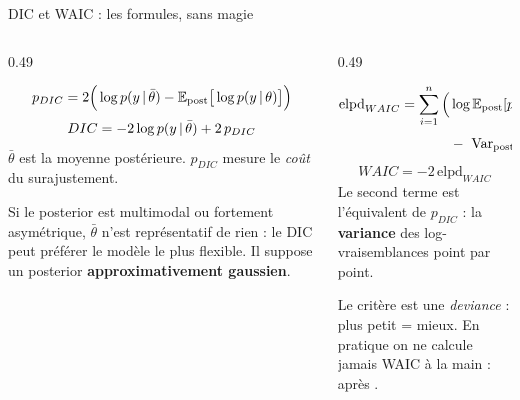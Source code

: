 \begin{frame}{DIC et WAIC : les formules, sans magie}
\small
\begin{columns}[t]
\begin{column}{0.49\textwidth}
\begin{ebox}
\[
p_{DIC} = 2\Big(\log p(y \,\vert\, \bar\theta) - \mathbb{E}_{\text{post}}\big[\log p(y \,\vert\, \theta)\big]\Big)
\]
\[
DIC = -2\log p(y \,\vert\, \bar\theta) + 2\,p_{DIC}
\]
$\bar\theta$ est la moyenne postérieure. $p_{DIC}$ mesure le \emph{coût}
du surajustement.
\end{ebox}
\begin{wbox}
Si le posterior est multimodal ou fortement asymétrique,
$\bar\theta$ n'est représentatif de rien : le DIC peut préférer le modèle
le plus flexible. Il suppose un posterior \textbf{approximativement gaussien}.
\end{wbox}
\end{column}
\begin{column}{0.49\textwidth}
\begin{ebox}
\begin{align*}
\text{elpd}_{WAIC} = \sum_{i=1}^{n}\Big(&\log \mathbb{E}_{\text{post}}[p(y_i \,\vert\, \theta)]\\
&-\ \mathrm{Var}_{\text{post}}[\log p(y_i \,\vert\, \theta)]\Big)
\end{align*}
\[
WAIC = -2\,\text{elpd}_{WAIC}
\]
Le second terme est l'équivalent de $p_{DIC}$ : la \textbf{variance} des
log-vraisemblances point par point.
\end{ebox}
\begin{kbox}
Le critère est une \emph{deviance} : plus petit = mieux.
En pratique on ne calcule jamais WAIC à la main :  après
.
\end{kbox}
\end{column}
\end{columns}
\end{frame}

